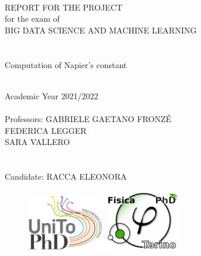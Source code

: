 \documentclass[11pt,a4paper]{article}
\begin{document}
\thispagestyle{empty}

\rmfamily
\begin{center}
\ \\
\vspace{2cm}

\LARGE{\textcolor[rgb]{1,0,0}{REPORT FOR THE PROJECT\\ for the exam of\\BIG DATA SCIENCE AND MACHINE LEARNING}\\}
\hrulefill \\
\huge{\textcolor[rgb]{1,0,0}{\ \\Computation of Napier's constant}\\}
\hrulefill \\
\vspace{1.5cm}

\Large{Academic Year 2021/2022
\\ \ \\
Professors: GABRIELE GAETANO FRONZÉ\\
FEDERICA LEGGER\hspace{4.2cm} \\
\hspace{-1cm}SARA VALLERO\hspace{15.2cm} \\
\ \\ \ \\ 
Candidate: RACCA ELEONORA}

\vspace{5cm}
\begin{figure}[h]
\centering
	\includegraphics[width=0.3\textwidth]{../Images/ScuolaDottoratoUnito.pdf} 
	\hspace{5mm} 
	\includegraphics[width=0.3\textwidth]{../Images/ScuolaDottoratoFisica.pdf}
\end{figure}

\end{center}
\end{document}
